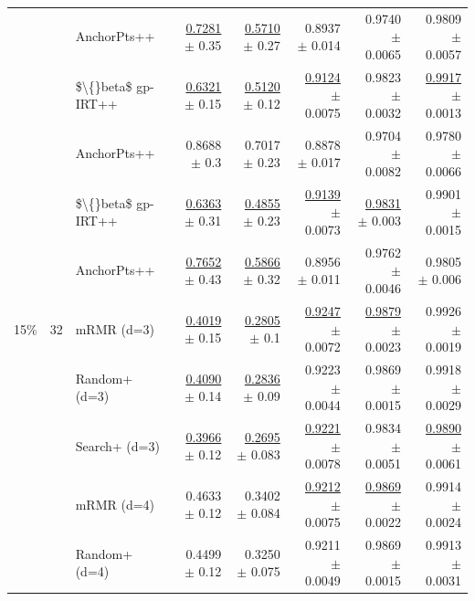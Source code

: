 \begin{longtable}{llp{}rrrrr}
 &  & AnchorPts++ & \underline{0.7281} {\scriptsize $\pm$ 0.35} & \underline{0.5710} {\scriptsize $\pm$ 0.27} & 0.8937 {\scriptsize $\pm$ 0.014} & 0.9740 {\scriptsize $\pm$ 0.0065} & 0.9809 {\scriptsize $\pm$ 0.0057} \\
 &  & \$\textbackslash\{\}beta\$ gp-IRT++ & \underline{0.6321} {\scriptsize $\pm$ 0.15} & \underline{0.5120} {\scriptsize $\pm$ 0.12} & \underline{0.9124} {\scriptsize $\pm$ 0.0075} & 0.9823 {\scriptsize $\pm$ 0.0032} & \underline{0.9917} {\scriptsize $\pm$ 0.0013} \\
 &  & AnchorPts++ & 0.8688 {\scriptsize $\pm$ 0.3} & 0.7017 {\scriptsize $\pm$ 0.23} & 0.8878 {\scriptsize $\pm$ 0.017} & 0.9704 {\scriptsize $\pm$ 0.0082} & 0.9780 {\scriptsize $\pm$ 0.0066} \\
 &  & \$\textbackslash\{\}beta\$ gp-IRT++ & \underline{0.6363} {\scriptsize $\pm$ 0.31} & \underline{0.4855} {\scriptsize $\pm$ 0.23} & \underline{0.9139} {\scriptsize $\pm$ 0.0073} & \underline{0.9831} {\scriptsize $\pm$ 0.003} & 0.9901 {\scriptsize $\pm$ 0.0015} \\
 &  & AnchorPts++ & \underline{0.7652} {\scriptsize $\pm$ 0.43} & \underline{0.5866} {\scriptsize $\pm$ 0.32} & 0.8956 {\scriptsize $\pm$ 0.011} & 0.9762 {\scriptsize $\pm$ 0.0046} & 0.9805 {\scriptsize $\pm$ 0.006} \\
\midrule
15\% & 32 & mRMR (d=3) & \underline{0.4019} {\scriptsize $\pm$ 0.15} & \underline{0.2805} {\scriptsize $\pm$ 0.1} & \underline{0.9247} {\scriptsize $\pm$ 0.0072} & \underline{0.9879} {\scriptsize $\pm$ 0.0023} & 0.9926 {\scriptsize $\pm$ 0.0019} \\
 &  & Random+ (d=3) & \underline{0.4090} {\scriptsize $\pm$ 0.14} & \underline{0.2836} {\scriptsize $\pm$ 0.09} & 0.9223 {\scriptsize $\pm$ 0.0044} & 0.9869 {\scriptsize $\pm$ 0.0015} & 0.9918 {\scriptsize $\pm$ 0.0029} \\
 &  & Search+ (d=3) & \underline{0.3966} {\scriptsize $\pm$ 0.12} & \underline{0.2695} {\scriptsize $\pm$ 0.083} & \underline{0.9221} {\scriptsize $\pm$ 0.0078} & 0.9834 {\scriptsize $\pm$ 0.0051} & \underline{0.9890} {\scriptsize $\pm$ 0.0061} \\
 &  & mRMR (d=4) & 0.4633 {\scriptsize $\pm$ 0.12} & 0.3402 {\scriptsize $\pm$ 0.084} & \underline{0.9212} {\scriptsize $\pm$ 0.0075} & \underline{0.9869} {\scriptsize $\pm$ 0.0022} & 0.9914 {\scriptsize $\pm$ 0.0024} \\
 &  & Random+ (d=4) & 0.4499 {\scriptsize $\pm$ 0.12} & 0.3250 {\scriptsize $\pm$ 0.075} & 0.9211 {\scriptsize $\pm$ 0.0049} & 0.9869 {\scriptsize $\pm$ 0.0015} & 0.9913 {\scriptsize $\pm$ 0.0031} \\

\end{longtable}
